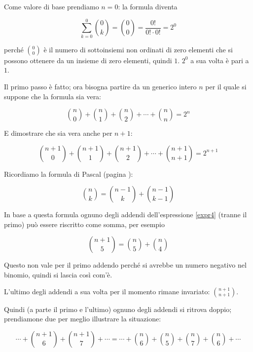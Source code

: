 Come valore di base prendiamo $n=0$: la formula diventa 

\begin{equation*}
\sum_{k=0}^{0}{\binom{0}{k}}=\binom{0}{0}=\frac{0!}{0!\cdot0!}=2^0
\end{equation*}

perché ${0 \choose 0}$ è il numero di sottoinsiemi non ordinati di zero elementi che si possono ottenere da un insieme di zero elementi, quindi $1$.  $2^0$ a sua volta è pari a $1$.

Il primo passo è fatto; ora bisogna partire da un generico intero $n$ per il quale si suppone che la formula sia vera:

\begin{equation*}
\binom{n}{0} + \binom{n}{1} + \binom{n}{2} + \cdots + \binom{n}{n} = 2^n
\end{equation*}

E dimostrare che sia vera anche per $n+1$:


\begin{equation}\label{expr4}
\binom{n+1}{0} + \binom{n+1}{1} + \binom{n+1}{2} + \cdots + \binom{n+1}{n+1} = 2^{n+1}
\end{equation}

Ricordiamo la formula di Pascal (pagina \pageref{formula_pascal}):


\begin{equation*}
{n \choose k}={n-1 \choose k}+{n-1 \choose k-1}
\end{equation*}

In base a questa formula ognuno degli addendi dell'espressione \ref{expr4} (tranne il primo) può essere riscritto come somma, per esempio


\begin{equation*}
{n+1 \choose 5}={n \choose 5}+{n \choose 4}
\end{equation*}

Questo non vale per il primo addendo perché si avrebbe un numero negativo nel binomio, quindi si lascia così com'è.

L'ultimo degli addendi a sua volta per il momento rimane invariato: ${n+1\choose n+1}$.

Quindi (a parte il primo e l'ultimo) ognuno degli addendi si ritrova doppio; prendiamone due per meglio illustrare la situazione:

\begin{equation*}
\cdots+{n+1\choose 6}+{n+1\choose 7}+\cdots
=
\cdots+{n\choose 6}+{n \choose 5}+{n\choose 7}+{n\choose 6}+\cdots
\end{equation*}

